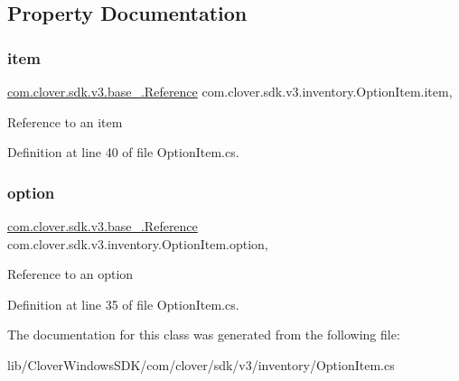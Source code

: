 \subsection{Property Documentation}
\mbox{\label{classcom_1_1clover_1_1sdk_1_1v3_1_1inventory_1_1_option_item_abf28f5c0ed9815e1a81cb41b67ff1167}} 
\subsubsection{\texorpdfstring{item}{item}}
{\footnotesize\ttfamily \hyperlink{classcom_1_1clover_1_1sdk_1_1v3_1_1base___1_1_reference}{com.\+clover.\+sdk.\+v3.\+base\+\_\+.\+Reference} com.\+clover.\+sdk.\+v3.\+inventory.\+Option\+Item.\+item\hspace{0.3cm}{\ttfamily [get]}, {\ttfamily [set]}}



Reference to an item 



Definition at line 40 of file Option\+Item.\+cs.

\mbox{\label{classcom_1_1clover_1_1sdk_1_1v3_1_1inventory_1_1_option_item_ab9113ba4bd277f3e8735999fab21c6ca}} 
\subsubsection{\texorpdfstring{option}{option}}
{\footnotesize\ttfamily \hyperlink{classcom_1_1clover_1_1sdk_1_1v3_1_1base___1_1_reference}{com.\+clover.\+sdk.\+v3.\+base\+\_\+.\+Reference} com.\+clover.\+sdk.\+v3.\+inventory.\+Option\+Item.\+option\hspace{0.3cm}{\ttfamily [get]}, {\ttfamily [set]}}



Reference to an option 



Definition at line 35 of file Option\+Item.\+cs.



The documentation for this class was generated from the following file\+:\begin{DoxyCompactItemize}
\item 
lib/\+Clover\+Windows\+S\+D\+K/com/clover/sdk/v3/inventory/Option\+Item.\+cs\end{DoxyCompactItemize}

